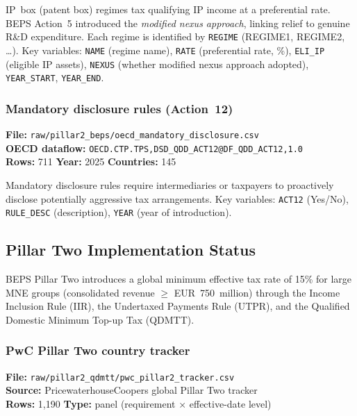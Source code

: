 \documentclass[11pt,a4paper]{article}
\newcommand{\code}[1]{\texttt{#1}}
\begin{document}
IP~box (patent box) regimes tax qualifying IP income at a preferential rate.  BEPS Action~5 introduced the \emph{modified nexus approach}, linking relief to genuine R\&D expenditure.  Each regime is identified by \code{REGIME} (REGIME1, REGIME2, \ldots).  Key variables: \code{NAME} (regime name), \code{RATE} (preferential rate, \%), \code{ELI\_IP} (eligible IP assets), \code{NEXUS} (whether modified nexus approach adopted), \code{YEAR\_START}, \code{YEAR\_END}.

\subsubsection{Mandatory disclosure rules (Action~12)}

\textbf{File:} \texttt{raw/pillar2\_beps/oecd\_mandatory\_disclosure.csv}\\
\textbf{OECD dataflow:} \texttt{OECD.CTP.TPS,DSD\_QDD\_ACT12@DF\_QDD\_ACT12,1.0}\\
\textbf{Rows:} 711 \quad \textbf{Year:} 2025 \quad \textbf{Countries:} 145

Mandatory disclosure rules require intermediaries or taxpayers to proactively disclose potentially aggressive tax arrangements.  Key variables: \code{ACT12} (Yes/No), \code{RULE\_DESC} (description), \code{YEAR} (year of introduction).


\subsection{Pillar Two Implementation Status}\label{sec:pillar2}

BEPS Pillar Two introduces a global minimum effective tax rate of 15\% for large MNE groups (consolidated revenue $\geq$ EUR~750~million) through the Income Inclusion Rule (IIR), the Undertaxed Payments Rule (UTPR), and
the Qualified Domestic Minimum Top-up Tax (QDMTT).

\subsubsection{PwC Pillar Two country tracker}

\textbf{File:} \texttt{raw/pillar2\_qdmtt/pwc\_pillar2\_tracker.csv}\\
\textbf{Source:} PricewaterhouseCoopers global Pillar Two tracker\\
\textbf{Rows:} 1{,}190 \quad \textbf{Type:} panel (requirement $\times$ effective-date level)
\end{document}
